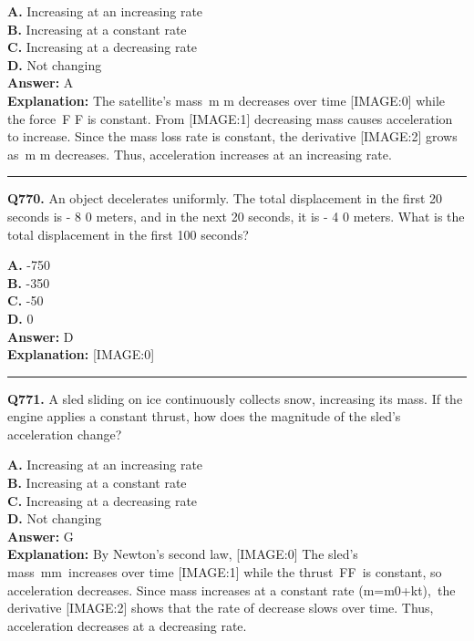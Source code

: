 \documentclass[12pt]{article}
\begin{document}
\textbf{A.} Increasing at an increasing rate \\
\textbf{B.} Increasing at a constant rate \\
\textbf{C.} Increasing at a decreasing rate \\
\textbf{D.} Not changing \\

\textbf{Answer:} A \\
\textbf{Explanation:} The satellite's mass m
m
decreases over time
[IMAGE:0]
while the force F
F
is constant. From
[IMAGE:1]
decreasing mass causes acceleration to increase. Since the mass loss rate is constant, the derivative
[IMAGE:2]
grows as m
m
decreases. Thus, acceleration increases at an increasing rate.

\hrule
\vspace{1em}


\noindent
\textbf{Q770.} An object decelerates uniformly. The total displacement in the first 20 seconds is -
8
0 meters, and in the next 20 seconds, it is -
4
0 meters. What is the total displacement in the first 100 seconds?



\textbf{A.} -750 \\
\textbf{B.} -350 \\
\textbf{C.} -50 \\
\textbf{D.} 0 \\

\textbf{Answer:} D \\
\textbf{Explanation:} [IMAGE:0]

\hrule
\vspace{1em}


\noindent
\textbf{Q771.} A sled sliding on ice continuously collects snow, increasing its mass. If the engine applies a constant thrust, how does the magnitude of the sled's acceleration change?



\textbf{A.} Increasing at an increasing rate \\
\textbf{B.} Increasing at a constant rate \\
\textbf{C.} Increasing at a decreasing rate \\
\textbf{D.} Not changing \\

\textbf{Answer:} G \\
\textbf{Explanation:} By Newton's second law,
[IMAGE:0]
The sled's mass mm increases over time
[IMAGE:1]
while the thrust FF is constant, so acceleration decreases. Since mass increases at a constant rate (m=m0+kt), the derivative
[IMAGE:2]
shows that the rate of decrease slows over time. Thus, acceleration decreases at a decreasing rate.
\end{document}
